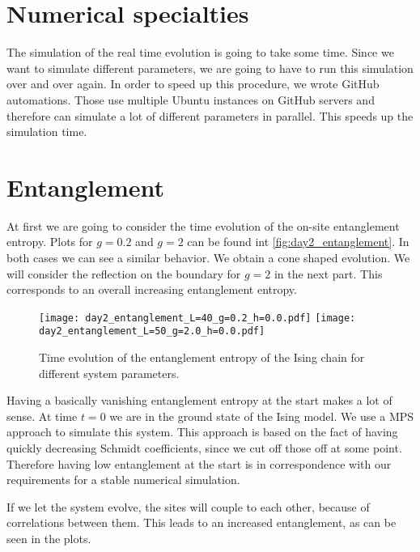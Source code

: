 \section{Numerical specialties}
The simulation of the real time evolution is going to take some time. Since we want to simulate different parameters, we are going to have to run this simulation over and over again.
In order to speed up this procedure, we wrote GitHub automations.
Those use multiple Ubuntu instances on GitHub servers and therefore can simulate a lot of different parameters in parallel.
This speeds up the simulation time.

\section{Entanglement}
At first we are going to consider the time evolution of the on-site entanglement entropy.
Plots for $g=\num{0.2}$ and $g=\num{2}$ can be found int \autoref{fig:day2_entanglement}.
In both cases we can see a similar behavior.
We obtain a cone shaped evolution.
We will consider the reflection on the boundary for $g=\num{2}$ in the next part.
This corresponds to an overall increasing entanglement entropy.

\begin{figure}[htbp]
    \centering
    \texttt{[image: day2\_entanglement\_L=40\_g=0.2\_h=0.0.pdf]}
    \texttt{[image: day2\_entanglement\_L=50\_g=2.0\_h=0.0.pdf]}
    \caption{Time evolution of the entanglement entropy of the Ising chain for different system parameters.}
    \label{fig:day2_entanglement}
\end{figure}


Having a basically vanishing entanglement entropy at the start makes a lot of sense.
At time $t=0$ we are in the ground state of the Ising model.
We use a MPS approach to simulate this system.
This approach is based on the fact of having quickly decreasing Schmidt coefficients, since we cut off those off at some point.
Therefore having low entanglement at the start is in correspondence with our requirements for a stable numerical simulation.

If we let the system evolve, the sites will couple to each other, because of correlations between them.
This leads to an increased entanglement, as can be seen in the plots.



